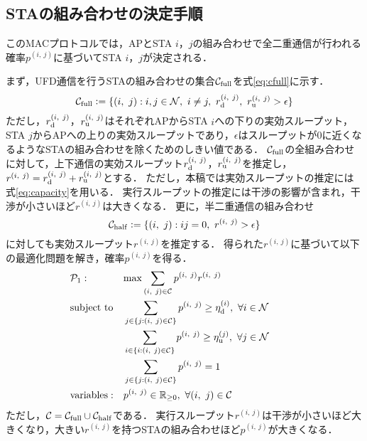 \documentclass[twocolumn, a4paper]{ieicejsp}
\newcommand{\sij}{(i,\ j)}
\newcommand{\pij}{p^{(i,\ j)}}
\newcommand{\rd}{r^{\sij}_{\rm d}}
\newcommand{\ru}{r^{\sij}_{\rm u}}
\newcommand{\rij}{r^{\sij}}
\def\coloneqq{\mathrel{\mathop:}=}
\begin{document}
	\subsection{STAの組み合わせの決定手順}\label{sec:promac}
		このMACプロトコルでは，APとSTA $i$，$j$の組み合わせで全二重通信が行われる確率$\pij$に基づいてSTA $i$，$j$が決定される．
		\par
		まず，UFD通信を行うSTAの組み合わせの集合${\mathcal C}_{\rm full}$を式\eqref{eq:cfull}に示す．
		\begin{equation}
			{\mathcal C}_{\rm full} \coloneqq \{\sij : i,j\in{\mathcal N},\ i\neq j,\ r^{\sij}_{\rm d},\ r^{\sij}_{\rm u}>\epsilon\} \label{eq:cfull}
		\end{equation}
		ただし，$r_{\rm d}^{\sij}$，$r_{\rm u}^{\sij}$はそれぞれAPからSTA $i$への下りの実効スループット，
		STA $j$からAPへの上りの実効スループットであり，$\epsilon$はスループットが0に近くなるようなSTAの組み合わせを除くためのしきい値である．
		${\mathcal C}_{\rm full}$の全組み合わせに対して，上下通信の実効スループット$\rd$，$\ru$を推定し，$\rij=\rd + \ru$とする．
		ただし，本稿では実効スループットの推定には式\eqref{eq:capacity}を用いる．
		実行スループットの推定には干渉の影響が含まれ，干渉が小さいほど$\rij$は大きくなる．
		更に，半二重通信の組み合わせ
		\begin{equation}
			{\mathcal C}_{\rm half} \coloneqq \{\sij : ij=0,\ \rij >\epsilon\}
		\end{equation}
		に対しても実効スループット$\rij$を推定する．
		得られた$\rij$に基づいて以下の最適化問題を解き，確率$\pij$を得る．
		\begin{align}
			&{\mathcal P}_1: && {\rm max} \sum_{(i,\ j)\in{\mathcal C}} p^{(i,\ j)}r^{(i,\ j)} &&&&&& \label{eq:p1}\\
			&{\rm subject\ to} && \sum_{j\in\{j:(i,\ j)\in{\mathcal C}\}} p^{(i,\ j)} \geq \eta_{\rm d}^{(i)},\ \forall i\in {\mathcal N}  \\
			&&& \sum_{i\in\{i:(i,\ j)\in{\mathcal C}\}} p^{(i,\ j)} \geq \eta_{\rm u}^{(j)},\ \forall j\in {\mathcal N} \label{eq:pu}\\
			&&& \sum_{j\in\{j:(i,\ j)\in{\mathcal C}\}} p^{(i,\ j)}=1 \\
			&{\rm variables:} &&p^{(i,\ j)} \in {\mathbb R}_{\geq 0},\ \forall(i,\ j)\in {\mathcal C} \nonumber
		\end{align}
		ただし，${\mathcal C} = {\mathcal C}_{\rm full} \cup {\mathcal C}_{\rm half}$である．
		実行スループット$\rij$は干渉が小さいほど大きくなり，大きい$\rij$を持つSTAの組み合わせほど$p^{\sij}$が大きくなる．
\end{document}
